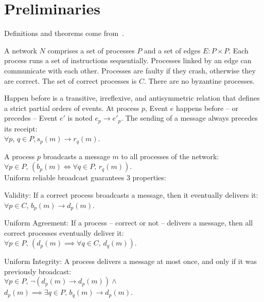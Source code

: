 
\section{Preliminaries}
\label{sec:preliminaries}

Definitions and theorems come from~\cite{hadzilacos1994modular}.

\begin{definition}[Network]
  A network $N$ comprises a set of processes $P$ and a set of edges
  $E: P \times P$. Each process runs a set of instructions
  sequentially. Processes linked by an edge can communicate with each
  other. Processes are faulty if they crash, otherwise they are correct. The set
  of correct processes is $C$. There are no byzantine processes.
\end{definition}



\begin{definition}
  Happen before is a transitive, irreflexive, and antisymmetric relation that
  defines a strict partial orders of events. At process $p$, Event $e$ happens
  before -- or precedes -- Event $e'$ is noted $e_p \rightarrow e'_p$. The
  sending of a message always precedes its receipt: \\
  $\forall p,\,q \in P, s_p(m) \rightarrow r_q(m)$.
\end{definition}

\begin{definition}
  A process $p$ broadcasts a message $m$ to all processes of the network: \\
  $\forall p \in P,\, (b_p(m) \Leftrightarrow \forall q \in P,\, r_q(m))$. \\
  Uniform reliable broadcast guarantees 3 properties:

  \begin{asparadesc}
  \item [Validity:] If a correct process broadcasts a message, then it eventually
    delivers it: $\forall p \in C,\, b_p(m) \rightarrow d_p(m)$.
  \item [Uniform Agreement:] If a process -- correct or not -- delivers a message,
    then all correct processes eventually deliver it:\\
    $\forall p \in P,\, (d_p(m) \implies \forall q \in C,\, d_q(m))$.
  \item [Uniform Integrity:] A process delivers a message at most once, and
    only if it was previously broadcast:\\
    $\forall p \in P,\, \neg(d_p(m) \rightarrow d_p(m)) \wedge$\\$d_p(m)
    \implies \exists q \in P,\, b_q(m) \rightarrow d_p(m)$.
\end{asparadesc}

\end{definition}


